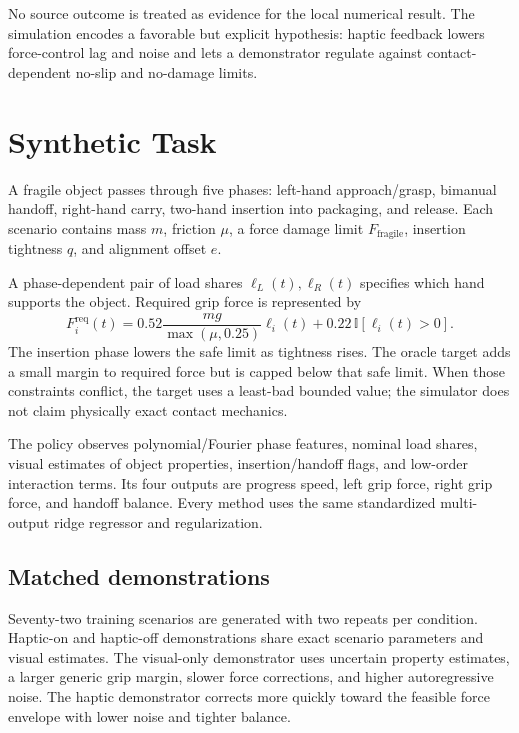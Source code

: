 \documentclass[11pt]{article}
\begin{document}
No source outcome is treated as evidence for the local numerical result. The simulation encodes a favorable but explicit hypothesis: haptic feedback lowers force-control lag and noise and lets a demonstrator regulate against contact-dependent no-slip and no-damage limits.

\section{Synthetic Task}

A fragile object passes through five phases: left-hand approach/grasp, bimanual handoff, right-hand carry, two-hand insertion into packaging, and release. Each scenario contains mass $m$, friction $\mu$, a force damage limit $F_{\mathrm{fragile}}$, insertion tightness $q$, and alignment offset $e$.

A phase-dependent pair of load shares $\ell_L(t),\ell_R(t)$ specifies which hand supports the object. Required grip force is represented by
\begin{equation}
F^{\mathrm{req}}_i(t)=0.52\frac{mg}{\max(\mu,0.25)}\ell_i(t)+0.22\,\mathbb{I}[\ell_i(t)>0].
\end{equation}
The insertion phase lowers the safe limit as tightness rises. The oracle target adds a small margin to required force but is capped below that safe limit. When those constraints conflict, the target uses a least-bad bounded value; the simulator does not claim physically exact contact mechanics.

The policy observes polynomial/Fourier phase features, nominal load shares, visual estimates of object properties, insertion/handoff flags, and low-order interaction terms. Its four outputs are progress speed, left grip force, right grip force, and handoff balance. Every method uses the same standardized multi-output ridge regressor and regularization.

\subsection{Matched demonstrations}

Seventy-two training scenarios are generated with two repeats per condition. Haptic-on and haptic-off demonstrations share exact scenario parameters and visual estimates. The visual-only demonstrator uses uncertain property estimates, a larger generic grip margin, slower force corrections, and higher autoregressive noise. The haptic demonstrator corrects more quickly toward the feasible force envelope with lower noise and tighter balance.
\end{document}
